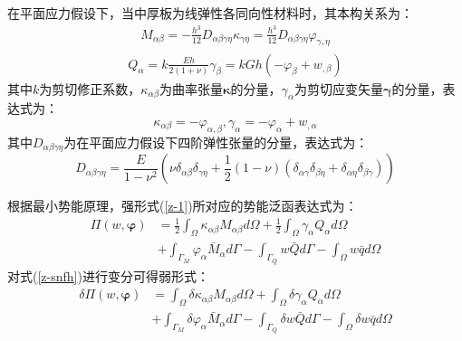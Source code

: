 在平面应力假设下，当中厚板为线弹性各同向性材料时，其本构关系为：
\begin{equation} 
    \begin{split}
    M_{\alpha \beta}=-\frac{h^3}{12}D_{\alpha \beta \gamma\eta}\kappa_{\gamma\eta}=\frac{h^3}{12}D_{\alpha \beta \gamma\eta}\varphi_{\gamma,\eta}
    \end{split}
\end{equation}
\begin{equation} 
    \begin{split}
    Q_{\alpha}=k\frac{Eh}{2(1+\nu)}\gamma_\beta=kGh(-\varphi_\beta+w_{,\beta})
    \end{split}
\end{equation}
其中$k$为剪切修正系数，$\kappa_{\alpha\beta}$为曲率张量$\pmb\kappa$的分量，$\gamma_\alpha$为剪切应变矢量$\pmb\gamma$的分量，表达式为：
\begin{equation} 
    \kappa_{\alpha\beta}=-\varphi_{\alpha,\beta},\gamma_\alpha=-\varphi_\alpha+w_{,\alpha}
\end{equation}
其中$D_{\alpha \beta \gamma\eta}$为在平面应力假设下四阶弹性张量的分量，表达式为：
\begin{equation} 
    D_{\alpha \beta \gamma\eta}=\frac{E}{1-\nu^2}(\nu\delta_{\alpha\beta}\delta_{\gamma\eta}+\frac{1}{2}(1-\nu)(\delta_{\alpha\gamma}\delta_{\beta\eta}+\delta_{\alpha\eta}\delta_{\beta\gamma}))
\end{equation}

根据最小势能原理，强形式(\ref{z-1})所对应的势能泛函表达式为： 
\begin{equation}\label{z-snfh}
\begin{split} 
    \Pi(w,\boldsymbol{\varphi})&=\frac{1}{2}\int_{\Omega}\kappa_{\alpha\beta}M_{\alpha\beta}d\Omega+\frac{1}{2}\int_{\Omega}\gamma_{\alpha}Q_{\alpha}d\Omega\\
    &+\int_{\Gamma_{M}}\varphi_{\alpha}{\bar{M}_{\alpha}}d\Gamma-\int_{\Gamma_{Q}}{w}\bar {Q}d\Gamma-\int_{\Omega} w\bar{q}d\Omega
\end{split}
\end{equation}
对式(\ref{z-snfh})进行变分可得弱形式：
\begin{equation}\label{z-rxs}
    \begin{split} 
        \delta\Pi(w,\boldsymbol{\varphi})&=\int_{\Omega}\delta\kappa_{\alpha\beta}M_{\alpha\beta}d\Omega+\int_{\Omega}\delta\gamma_{\alpha}Q_{\alpha}d\Omega\\
        &+\int_{\Gamma_{M}}\delta\varphi_{\alpha}{\bar{M}_{\alpha}}d\Gamma-\int_{\Gamma_{Q}}{\delta{w}}\bar {Q}d\Gamma-\int_{\Omega} \delta{w}\bar{q}d\Omega
    \end{split}
    \end{equation}

